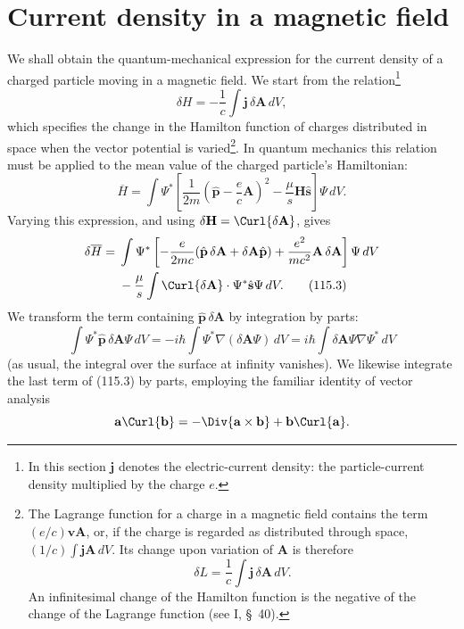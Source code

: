 \section{Current density in a magnetic field}

We shall obtain the quantum-mechanical expression for the current density of a
charged particle moving in a magnetic field. We start from the relation\footnote{In
this section $\mathbf j$ denotes the electric-current density: the particle-current
density multiplied by the charge $e$.}
\begin{equation}
 \delta H=-\frac1c\int\mathbf j\,\delta\mathbf A\,dV,
 \tag{115.1}
\end{equation}
which specifies the change in the Hamilton function of charges distributed in
space when the vector potential is varied\footnote{The Lagrange function for a
charge in a magnetic field contains the term $(e/c)\mathbf v\mathbf A$, or, if
the charge is regarded as distributed through space,
$(1/c)\int\mathbf j\mathbf A\,dV$. Its change upon variation of $\mathbf A$ is
therefore
\[
 \delta L=\frac1c\int\mathbf j\,\delta\mathbf A\,dV.
\]
An infinitesimal change of the Hamilton function is the negative of the change
of the Lagrange function (see I, \S~40).}. In quantum mechanics this relation
must be applied to the mean value of the charged particle's Hamiltonian:
\begin{equation}
 \overline H=\int\Psi^*\left[
 \frac1{2m}\left(\hat{\mathbf p}-\frac ec\mathbf A\right)^2
 -\frac\mu s\mathbf H\hat{\mathbf s}\right]\Psi\,dV.
 \tag{115.2}
\end{equation}
Varying this expression, and using
$\delta\mathbf H=\Curl{\delta\mathbf A}$, gives
\begin{align}
 \delta\overline H={}&\int\Psi^*\left[-\frac e{2mc}
 (\hat{\mathbf p}\,\delta\mathbf A+\delta\mathbf A\hat{\mathbf p})
 +\frac{e^2}{mc^2}\mathbf A\,\delta\mathbf A\right]\Psi\,dV\notag\\
 &-\frac\mu s\int\Curl{\delta\mathbf A}\cdot
 \Psi^*\hat{\mathbf s}\Psi\,dV.
 \tag{115.3}
\end{align}
We transform the term containing $\hat{\mathbf p}\,\delta\mathbf A$ by
integration by parts:
\[
 \int\Psi^*\hat{\mathbf p}\,\delta\mathbf A\Psi\,dV
 =-i\hbar\int\Psi^*\nabla(\delta\mathbf A\Psi)\,dV
 =i\hbar\int\delta\mathbf A\Psi\nabla\Psi^*\,dV
\]
(as usual, the integral over the surface at infinity vanishes). We likewise
integrate the last term of (115.3) by parts, employing the familiar identity of
vector analysis
\[
 \mathbf a\Curl{\mathbf b}
 =-\Div{\mathbf a\times\mathbf b}
 +\mathbf b\Curl{\mathbf a}.
\]

